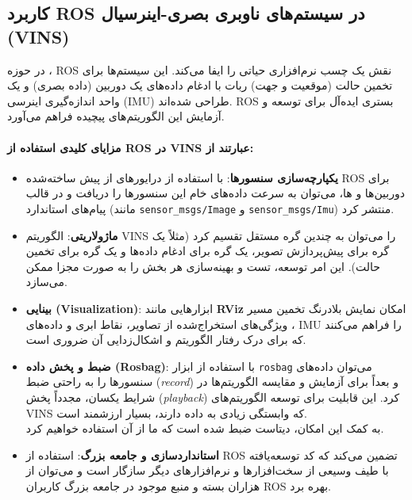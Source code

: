 \documentclass[11pt, a4paper]{article}
\begin{document}
	\subsection{کاربرد \Gls{ROS} در سیستم‌های ناوبری بصری-اینرسیال (VINS)}
	\label{subsec:ros_in_vins}
	
	در حوزه
	، \gls{ROS} 
	نقش یک چسب نرم‌افزاری حیاتی را ایفا می‌کند. این سیستم‌ها برای تخمین حالت (موقعیت و جهت) ربات با ادغام داده‌های یک دوربین (داده بصری)
	و یک واحد اندازه‌گیری اینرسی
	(\gls{IMU}) طراحی شده‌اند. \gls{ROS} بستری ایده‌آل برای توسعه و آزمایش این الگوریتم‌های پیچیده فراهم می‌آورد.
	\paragraph{مزایای کلیدی استفاده از \gls{ROS}  در \gls{VINS} عبارتند از:}
	
	\begin{itemize}
		\item \textbf{یکپارچه‌سازی سنسورها}: با استفاده از درایورهای از پیش ساخته‌شده \gls{ROS} برای دوربین‌ها و ها، می‌توان به سرعت داده‌های خام این سنسورها را دریافت و در قالب پیام‌های استاندارد (مانند \texttt{sensor\_msgs/Image} و \texttt{sensor\_msgs/Imu}) منتشر کرد.
		\item \textbf{ماژولاریتی}: الگوریتم VINS را می‌توان به چندین گره مستقل تقسیم کرد (مثلاً یک گره برای پیش‌پردازش تصویر، یک گره برای ادغام داده‌ها و یک گره برای تخمین حالت). این امر توسعه، تست و بهینه‌سازی هر بخش را به صورت مجزا ممکن می‌سازد.
		\item \textbf{بینایی (Visualization)}: ابزارهایی مانند \textbf{RViz} امکان نمایش بلادرنگ تخمین مسیر ، ویژگی‌های استخراج‌شده از تصاویر، نقاط ابری و داده‌های IMU را فراهم می‌کنند که برای درک رفتار الگوریتم و اشکال‌زدایی آن ضروری است.
		\item \textbf{ضبط و پخش داده (Rosbag)}: با استفاده از ابزار \texttt{rosbag} می‌توان داده‌های سنسورها را به راحتی ضبط (\textit{record}) و بعداً برای آزمایش و مقایسه الگوریتم‌ها در شرایط یکسان، مجدداً پخش (\textit{playback}) کرد. این قابلیت برای توسعه الگوریتم‌های VINS که وابستگی زیادی به داده دارند، بسیار ارزشمند است.
		\\
		به کمک این امکان، دیتاست 
		ضبط شده است که ما از آن استفاده خواهیم کرد.
		\item \textbf{استانداردسازی و جامعه بزرگ}: استفاده از \gls{ROS} تضمین می‌کند که کد توسعه‌یافته با طیف وسیعی از سخت‌افزارها و نرم‌افزارهای دیگر سازگار است و می‌توان از هزاران بسته و منبع موجود در جامعه بزرگ کاربران 
		\gls{ROS} بهره برد.
	\end{itemize}
	
\end{document}
